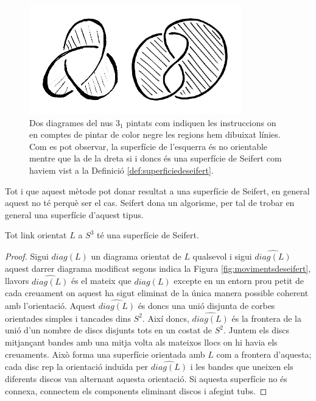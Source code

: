 \begin{figure}
	\centering
	\includegraphics[width=0.6\linewidth]{img/trefoilseifert.png}
	\caption{Dos diagrames del nus $3_1$ pintats com indiquen les instruccions on en comptes de pintar de color negre les regions hem dibuixat línies. Com es pot observar, la superfície de l'esquerra és no orientable mentre que la de la dreta si i doncs és una superfície de Seifert com haviem vist a la Definició \ref{def:superficiedeseifert}.}\label{fig:trefoilseifert}
\end{figure}

Tot i que aquest mètode pot donar resultat a una superfície de Seifert, en general aquest no té perquè ser el cas. Seifert dona un algorisme, per tal de trobar en general una superfície d'aquest tipus.\\

\begin{theorem}\label{theo:existenciadesuperficiesdeseifert}
	Tot link orientat $L$ a $S^3$ té una superfície de Seifert.
\end{theorem}

\begin{proof}
	Sigui $diag(L)$ un diagrama orientat de $L$ qualsevol i sigui $\widehat{diag(L)}$ aquest darrer diagrama modificat segons indica la Figura \ref{fig:movimentsdeseifert}, llavors $\widehat{diag(L)}$ és el mateix que $diag(L)$ excepte en un entorn prou petit de cada creuament on aquest ha sigut eliminat de la única manera possible coherent amb l'orientació. Aquest $\widehat{diag(L)}$ és doncs una unió disjunta de corbes orientades simples i tancades dins $S^2$. Així doncs, $\widehat{diag(L)}$ és la frontera de la unió d'un nombre de discs disjunts tots en un costat de $S^2$. Juntem els discs mitjançant bandes amb una mitja volta als mateixos llocs on hi havia els creuaments. Això forma una superfície orientada amb $L$ com a frontera d'aquesta; cada disc rep la orientació induïda per $\widehat{diag(L)}$ i les bandes que uneixen els diferents discos van alternant aquesta orientació. Si aquesta superfície no és connexa, connectem els components eliminant discos i afegint tubs.
\end{proof}

